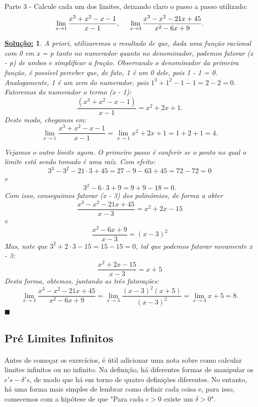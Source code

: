 \documentclass{article}
\newtheorem*{sol*}{\underline{Solu\c c\~ao:}}
\renewcommand\qedsymbol{$\blacksquare$}
\begin{document}
\paragraph{} Parte 3 - Calcule cada um dos limites, deixando claro o passo a passo utilizado: 
$$
\lim_{x\to1} \frac{x^3 + x^2 - x - 1}{x - 1}, \hspace{0.5cm} \lim_{x\to3}\frac{x^3 - x^2 - 21x + 45}{x^2 - 6x + 9}.
$$
\begin{sol*}
A priori, utilizaremos o resultado de que, dada uma fun\c c\~ao racional com 0 em x = p tanto no numerador quanto no denominador, podemos fatorar (x - p) de ambos e simplificar a fra\c c\~ao. Observando o denominador da primeira fun\c c\~ao, \'e poss\'ivel perceber que, de fato, 1 \'e um 0 dele, pois 1 - 1 = 0. Analogamente, 1 \'e um zero do numerador, pois $1^3 + 1^2 - 1 - 1 = 2 - 2 = 0$. Fatoremos do numerador o termo (x - 1):
$$
\frac{(x^3 + x^2 - x - 1)}{x - 1} = x^2 + 2x + 1.
$$
Deste modo, chegamos em: 
$$
\lim_{x\to{1}}\frac{x^3 + x^2 - x - 1}{x - 1} = \lim_{x\to{1}}x^2 + 2x + 1 = 1 + 2 + 1 = 4.
$$

Vejamos o outro limite agora. O primeiro passo \'e conferir se o ponto no qual o limite est\'a sendo tomado \'e uma ra\'iz. Com efeito:
$$
3^3 - 3^2 - 21\cdot{3} + 45 = 27 - 9 - 63 + 45 = 72 - 72 = 0 
$$
e
$$
3^2 - 6\cdot{3} + 9 = 9 + 9 - 18 = 0.
$$
Com isso, conseguimos fatorar (x - 3) dos polin\^omios, de forma a obter
$$
\frac{x^3 - x^2 - 21x + 45}{x-3} = x^2 + 2x - 15
$$
e
$$
\frac{x^2 - 6x + 9}{x - 3}  = (x - 3)^2
$$
Mas, note que $3^2 + 2\cdot{3} - 15 = 15 - 15 = 0$, tal que podemos fatorar novamente x - 3:
$$
\frac{x^2 + 2x - 15}{x - 3} = x + 5
$$
Desta forma, obtemos, juntando as tr\^es fatora\c c\~oes:
$$
\lim_{x\to3}\frac{x^3 - x^2 - 21x + 45}{x^2 - 6x + 9} = \lim_{x\to3}\frac{(x - 3)^2 (x+5)}{(x - 3)^2} = \lim_{x\to3}x + 5 = 8.
$$
\qedsymbol
\end{sol*}

\subsection{Pr\'e Limites Infinitos}
\paragraph{} Antes de come\c car os exerc\'icios, \'e \'util adicionar uma nota sobre como calcular limites infinitos ou no infinito. Na defini\c c\~ao, h\'a diferentes formas de manipular os $\epsilon's-\delta's$, de modo que h\'a em torno de quatro defini\c c\~oes diferentes. No entanto, h\'a uma forma mais simples de lembrar como definir cada coisa e, para isso, comecemos com a hip\'otese de que "Para cada $\epsilon > 0$ existe um $\delta > 0$". 
\end{document}

